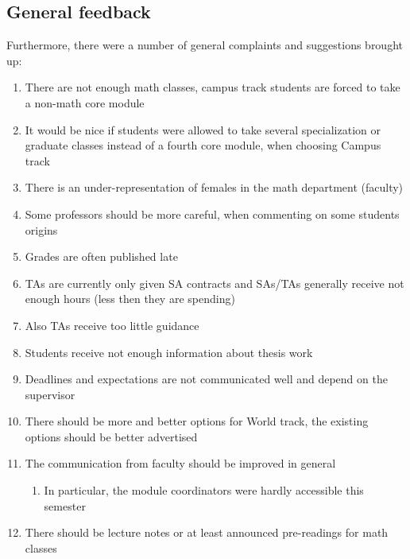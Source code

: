 \subsection{General feedback}
\label{sec-1-2}
Furthermore, there were a number of general complaints and suggestions brought up:
\begin{enumerate}
\item There are not enough math classes, campus track students are forced to take a non-math core module
\item It would be nice if students were allowed to take several specialization or graduate classes instead of a fourth core module, when choosing Campus track
\item There is an under-representation of females in the math department (faculty)
\item Some professors should be more careful, when commenting on some students origins
\item Grades are often published late
\item TAs are currently only given SA contracts and SAs/TAs generally receive not enough hours (less then they are spending)
\item Also TAs receive too little guidance
\item Students receive not enough information about thesis work
\item Deadlines and expectations are not communicated well and depend on the supervisor
\item There should be more and better options for World track, the existing options should be better advertised
\item The communication from faculty should be improved in general
\begin{enumerate}
\item In particular, the module coordinators were hardly accessible this semester
\end{enumerate}
\item There should be lecture notes or at least announced pre-readings for math classes
\end{enumerate}


